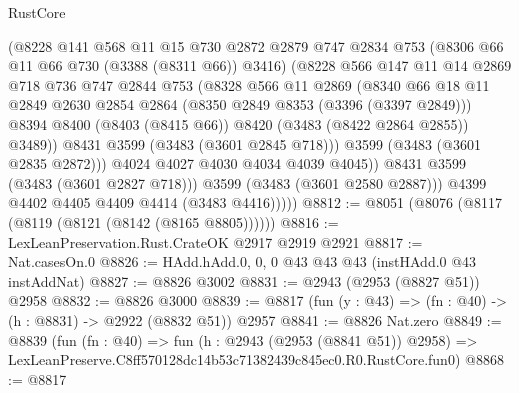 \begin{lexlean}{RustCore}
\begin{coremodule}
                    (@8228
                      @141
                      @568
                      @11
                      @15
                      @730
                      @2872
                      @2879
                      @747
                      @2834
                      @753
                      (@8306 @66 @11 @66 @730 (@3388 (@8311 @66)) @3416)
                      (@8228
                        @566
                        @147
                        @11
                        @14
                        @2869
                        @718
                        @736
                        @747
                        @2844
                        @753
                        (@8328
                          @566
                          @11
                          @2869
                          (@8340
                            @66
                            @18
                            @11
                            @2849
                            @2630
                            @2854
                            @2864
                            (@8350 @2849 @8353 (@3396 (@3397 @2849)))
                            @8394
                            @8400
                            (@8403 (@8415 @66))
                            @8420
                            (@3483 (@8422 @2864 @2855))
                            @3489))
                        @8431
                        @3599
                        (@3483 (@3601 @2845 @718)))
                      @3599
                      (@3483 (@3601 @2835 @2872)))
                    @4024
                    @4027
                    @4030
                    @4034
                    @4039
                    @4045))
                @8431
                @3599
                (@3483 (@3601 @2827 @718)))
              @3599
              (@3483 (@3601 @2580 @2887)))
            @4399
            @4402
            @4405
            @4409
            @4414
            (@3483 @4416)))))
@8812 := @8051 (@8076 (@8117 (@8119 (@8121 (@8142 (@8165 @8805))))))
@8816 := LexLeanPreservation.Rust.CrateOK @2917 @2919 @2921
@8817 := Nat.casesOn.{0}
@8826 := HAdd.hAdd.{0, 0, 0} @43 @43 @43 (instHAdd.{0} @43 instAddNat)
@8827 := @8826 @3002
@8831 := @2943 (@2953 (@8827 @51)) @2958
@8832 := @8826 @3000
@8839 := @8817 (fun (y : @43) => (fn : @40) -> (h : @8831) -> @2922 (@8832 @51)) @2957
@8841 := @8826 Nat.zero
@8849 := @8839
    (fun (fn : @40) =>
    fun (h : @2943 (@2953 (@8841 @51)) @2958) =>
    LexLeanPreserve.C8ff570128dc14b53c71382439c845ec0.R0.RustCore.fun0)
@8868 := @8817

\end{coremodule}
\end{lexlean}
